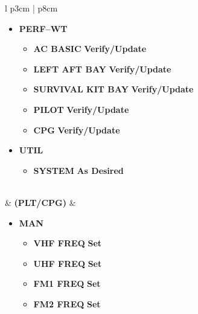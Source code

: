 \documentclass[fontHelvetica]{TechCheck}
\begin{document}
\begin{center}
\begin{longtable}{l p{3cm} | p{8cm}}
\begin{minipage}[t]{\linewidth}
\begin{itemize}
\begin{itemize}
					\end{itemize}
					\item \textbf{PERF--WT}
					\begin{itemize}
						\item \textbf{AC BASIC} \dotfill \textbf{Verify/Update}
						\item \textbf{LEFT AFT BAY} \dotfill \textbf{Verify/Update}
						\item \textbf{SURVIVAL KIT BAY} \dotfill \textbf{Verify/Update}
						\item \textbf{PILOT} \dotfill \textbf{Verify/Update}
						\item \textbf{CPG} \dotfill \textbf{Verify/Update}
					\end{itemize}
					\item \textbf{UTIL}
					\begin{itemize}
						\item \textbf{SYSTEM} \dotfill \textbf{As Desired}
					\end{itemize}
				\end{itemize}
			\end{minipage} \\
			\midrule
			\textbf{\textbullet} &  \textbf{(PLT/CPG)} &
			\begin{minipage}[t]{\linewidth}
				\begin{itemize}
					\item \textbf{MAN}
					\begin{itemize}
						\item \textbf{VHF FREQ} \dotfill \textbf{Set}
						\item \textbf{UHF FREQ} \dotfill \textbf{Set}
						\item \textbf{FM1 FREQ} \dotfill \textbf{Set}
						\item \textbf{FM2 FREQ} \dotfill \textbf{Set}
					\end{itemize}
				\end{itemize}
			\end{minipage} \\
			\bottomrule
		\end{longtable}
	\end{center}

\end{document}
